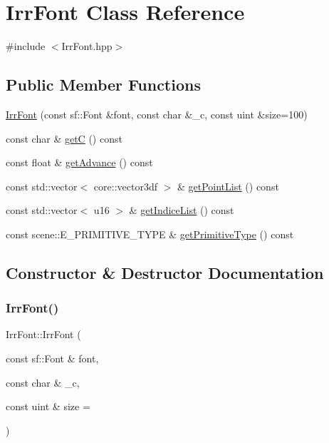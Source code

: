 \hypertarget{class_irr_font}{}\section{Irr\+Font Class Reference}
\label{class_irr_font}


{\ttfamily \#include $<$Irr\+Font.\+hpp$>$}

\subsection*{Public Member Functions}
\begin{DoxyCompactItemize}
\item 
\mbox{\hyperlink{class_irr_font_a1411a0e5f00d76ae25ceb3ea4901b757}{Irr\+Font}} (const sf\+::\+Font \&font, const char \&\+\_\+c, const uint \&size=100)
\item 
const char \& \mbox{\hyperlink{class_irr_font_a59e72c80a686bf8bb3935ac5b45a70db}{getC}} () const
\item 
const float \& \mbox{\hyperlink{class_irr_font_aace44039b7890675a4bf0fce831132cb}{get\+Advance}} () const
\item 
const std\+::vector$<$ core\+::vector3df $>$ \& \mbox{\hyperlink{class_irr_font_aa061c6d64afeaf59a2b2b6396e1ca708}{get\+Point\+List}} () const
\item 
const std\+::vector$<$ u16 $>$ \& \mbox{\hyperlink{class_irr_font_a8664e942750c1d7d1515d77cebc8ad57}{get\+Indice\+List}} () const
\item 
const scene\+::\+E\+\_\+\+P\+R\+I\+M\+I\+T\+I\+V\+E\+\_\+\+T\+Y\+PE \& \mbox{\hyperlink{class_irr_font_a5491c92f427cf8c87daee2a416bc2cd9}{get\+Primitive\+Type}} () const
\end{DoxyCompactItemize}


\subsection{Constructor \& Destructor Documentation}
\mbox{\label{class_irr_font_a1411a0e5f00d76ae25ceb3ea4901b757}} 
\subsubsection{\texorpdfstring{IrrFont()}{IrrFont()}}
{\footnotesize\ttfamily Irr\+Font\+::\+Irr\+Font (\begin{DoxyParamCaption}\item[{const sf\+::\+Font \&}]{font,  }\item[{const char \&}]{\+\_\+c,  }\item[{const uint \&}]{size = {} }\end{DoxyParamCaption})}



